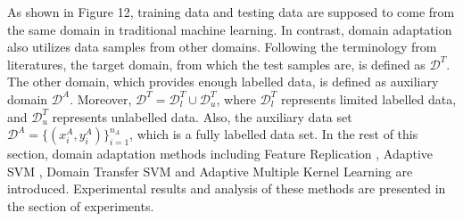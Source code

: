\noindent As shown in Figure 12, training data and testing data are supposed to come from the same domain in traditional machine learning. In contrast, domain adaptation also utilizes data samples from other domains. Following the terminology from literatures, the target domain, from which the test samples are, is defined as $\mathcal{D}^T$. The other domain, which provides enough labelled data, is defined as auxiliary domain $\mathcal{D}^A$. Moreover, $\mathcal{D}^T = \mathcal{D}_l^T \cup \mathcal{D}_u^T$, where $\mathcal{D}_l^T$ represents limited labelled data, and $\mathcal{D}_u^T$ represents unlabelled data. Also, the auxiliary data set $\mathcal{D}^A = \{(x_i^A, y_i^A)\}_{i=1}^{n_A}$, which is a fully labelled data set. In the rest of this section, domain adaptation methods including Feature Replication \cite{daume2007frustratingly}, Adaptive SVM \cite{yang2007cross}, Domain Transfer SVM \cite{duan2009domain} and Adaptive Multiple Kernel Learning \cite{duan2012visual} are introduced. Experimental results and analysis of these methods are presented in the section of experiments.

